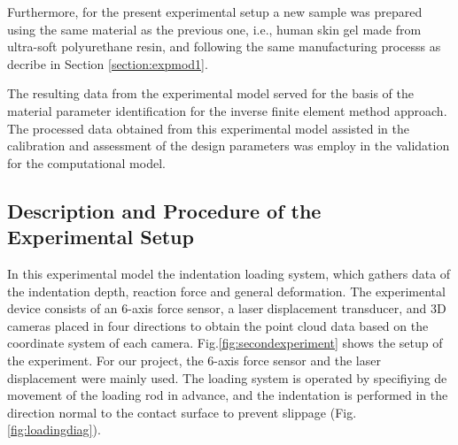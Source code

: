 Furthermore, for the present experimental setup a new sample was prepared using 
the same material as the previous one, i.e., human skin gel made from ultra-soft 
polyurethane resin, and following the same 
manufacturing processs as decribe in Section \ref{section:expmod1}. 

The resulting data from the experimental model served for the basis of the material 
parameter identification for the inverse finite element method approach.
The processed data obtained from this experimental model assisted in the calibration 
and assessment of the design parameters was employ in the validation for the 
computational model. 

\subsection*{Description and Procedure of the Experimental Setup}

In this experimental model the indentation loading system, which gathers data of the indentation 
depth, reaction force and general deformation. 
The experimental device consists of an 6-axis force sensor, a laser displacement transducer,
 and 3D cameras placed in four directions to obtain the point cloud data based on the 
 coordinate system of each camera. Fig.\ref{fig:secondexperiment} shows the setup of the 
 experiment. For our project, the 6-axis force sensor and the laser displacement were mainly used.
The loading system is operated by specifiying de movement of the loading rod in advance, and the 
indentation is performed in the direction normal to the contact surface to prevent slippage (Fig. \ref{fig:loadingdiag}).\\

